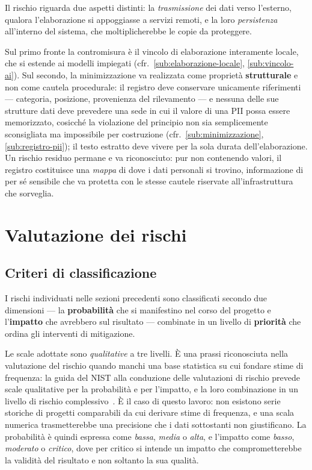 Il rischio riguarda due aspetti distinti: la \emph{trasmissione} dei dati verso l'esterno, qualora l'elaborazione si appoggiasse a servizi remoti, e la loro \emph{persistenza} all'interno del sistema, che moltiplicherebbe le copie da proteggere. \medskip

Sul primo fronte la contromisura è il vincolo di elaborazione interamente locale, che si estende ai modelli impiegati (cfr.~\ref{sub:elaborazione-locale}, \ref{sub:vincolo-ai}). Sul secondo, la minimizzazione va realizzata come proprietà \textbf{strutturale} e non come cautela procedurale: il registro deve conservare unicamente riferimenti --- categoria, posizione, provenienza del rilevamento --- e nessuna delle sue strutture dati deve prevedere una sede in cui il valore di una PII possa essere memorizzato, cosicché la violazione del principio non sia semplicemente sconsigliata ma impossibile per costruzione (cfr.~\ref{sub:minimizzazione}, \ref{sub:registro-pii}); il testo estratto deve vivere per la sola durata dell'elaborazione. Un rischio residuo permane e va riconosciuto: pur non contenendo valori, il registro costituisce una \emph{mappa} di dove i dati personali si trovino, informazione di per sé sensibile che va protetta con le stesse cautele riservate all'infrastruttura che sorveglia.


\section{Valutazione dei rischi}
\label{sec:valutazione-rischi}

\subsection{Criteri di classificazione}
\label{sub:criteri-classificazione}
I rischi individuati nelle sezioni precedenti sono classificati secondo due dimensioni --- la \textbf{probabilità} che si manifestino nel corso del progetto e l'\textbf{impatto} che avrebbero sul risultato --- combinate in un livello di \textbf{priorità} che ordina gli interventi di mitigazione. \medskip

Le scale adottate sono \textit{qualitative} a tre livelli. È una prassi riconosciuta nella valutazione del rischio quando manchi una base statistica su cui fondare stime di frequenza: la guida del NIST alla conduzione delle valutazioni di rischio prevede scale qualitative per la probabilità e per l'impatto, e la loro combinazione in un livello di rischio complessivo~\cite{nist80030RiskAssessments2012}. È il caso di questo lavoro: non esistono serie storiche di progetti comparabili da cui derivare stime di frequenza, e una scala numerica trasmetterebbe una precisione che i dati sottostanti non giustificano. La probabilità è quindi espressa come \textit{bassa}, \textit{media} o \textit{alta}, e l'impatto come \textit{basso}, \textit{moderato} o \textit{critico}, dove per critico si intende un impatto che comprometterebbe la validità del risultato e non soltanto la sua qualità. \medskip

